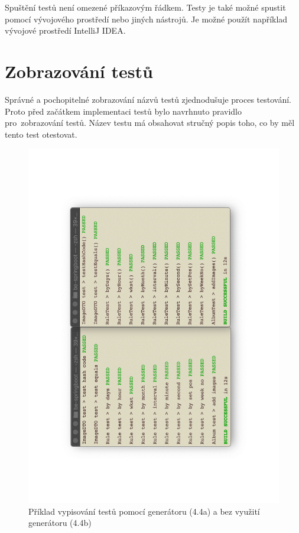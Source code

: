     Spuštění testů není omezené příkazovým řádkem. Testy je také možné spustit pomocí vývojového prostředí nebo jiných nástrojů. Je možné použít například vývojové prostředí IntelliJ IDEA. 
\section{Zobrazování testů}\label{testovani:zobrazovani}
    Správné a pochopitelné zobrazování názvů testů zjednodušuje proces testování. Proto před začátkem implementaci testů bylo navrhnuto pravidlo pro~zobrazování testů. Název testu má obsahovat stručný popis toho, co by měl tento test otestovat. 
    
    \begin{figure}\centering
	   \includegraphics[angle=-90, width=1.0\textwidth]{pdfs/pretty-tests-comparison}
	   \caption[Srovnaní zobrazováni kódu]{Příklad vypisování testů pomocí generátoru (4.4a) a bez využití generátoru (4.4b)}\label{image:pretty-tests-comparison}
    \end{figure}
